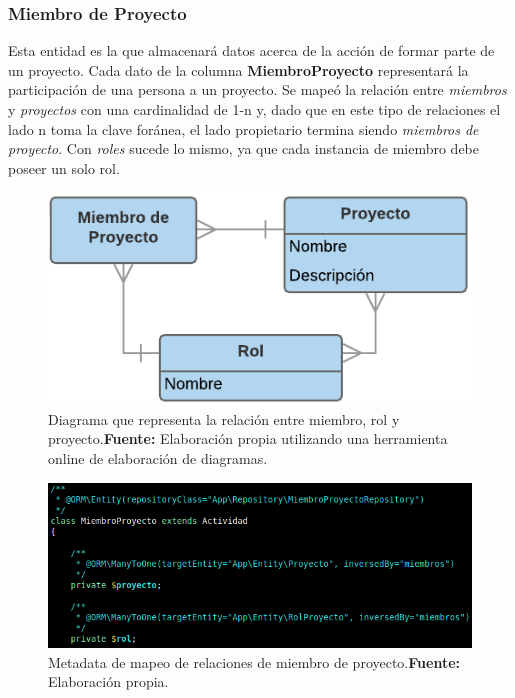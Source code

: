 \subsubsection{Miembro de Proyecto}%
\label{ssub:miembro_de_proyecto_modelo}
Esta entidad es la que almacenará datos acerca de la acción de formar parte de un proyecto. Cada dato de la columna \textbf{MiembroProyecto} representará la participación
de una persona a un proyecto\@.
Se mapeó la relación entre \textit{miembros} y \textit{proyectos} con una cardinalidad de 1-n y, dado que en este tipo de relaciones el lado n toma la clave foránea, el lado
propietario termina siendo \textit{miembros de proyecto}\@.
Con \textit{roles} sucede lo mismo, ya que cada instancia de miembro debe poseer un solo rol.

\begin{figure}[h]
    \includegraphics[width=1\linewidth]{image/mpr-new.png}
    \caption[Diagrama que representa la relación entre miembro, rol y proyecto]{Diagrama que representa la relación entre miembro, rol y proyecto.\newline \textbf{Fuente:} Elaboración propia utilizando una herramienta online de elaboración de diagramas.}
    \label{fig:image/mpr-new}
\end{figure}

\begin{figure}[H]
    \includegraphics[width=1\linewidth]{image/miembros.png}
    \caption[Metadata de mapeo de relaciones de miembro de proyecto]{Metadata de mapeo de relaciones de miembro de proyecto.\newline \textbf{Fuente:} Elaboración propia.}
    \label{fig:image/miembros}
\end{figure}

